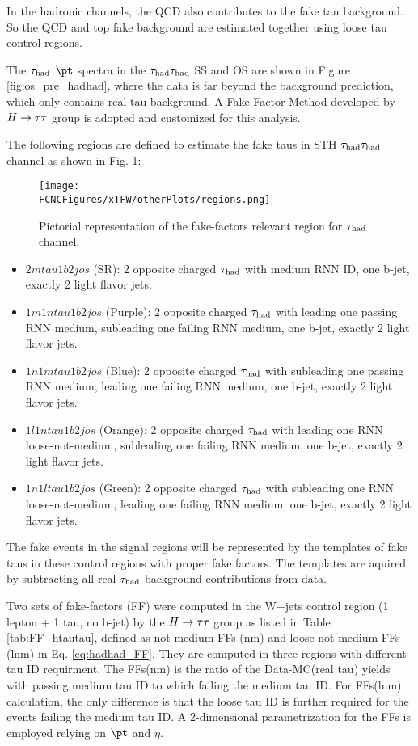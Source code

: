 In the hadronic channels, the QCD also contributes to the fake tau background. So the QCD and top fake background are estimated together using loose tau control regions.

The $\tau_\text{had}$ $\pt$ spectra in the $\tau_\text{had}{}\tau_\text{had}$ SS and OS are shown in Figure \ref{fig:os_pre_hadhad}, where the data is far beyond the background prediction, which only contains real tau background. A Fake Factor Method developed by $H \rightarrow \tau\tau$ group \cite{Htautau-note} is adopted and customized for this analysis. 

The following regions are defined to estimate the fake taus in STH $\tau_\text{had}{}\tau_\text{had}$ channel as shown in Fig. \ref{fig:regions_hadhad}:

\begin{figure}[htb]
\centering
\texttt{[image: \\FCNCFigures/xTFW/otherPlots/regions.png]}
\caption{Pictorial representation of the fake-factors relevant region for $\tau_\text{had}$ channel.}
\label{fig:regions_hadhad}
\end{figure}

\begin{itemize}
\item{$2mtau1b2jos$ (SR): 2 opposite charged $\tau_\text{had}$ with medium RNN ID, one b-jet, exactly 2 light flavor jets.}
\item{$1m1ntau1b2jos$ (Purple): 2 opposite charged $\tau_\text{had}$ with leading one passing RNN medium, subleading one failing RNN medium, one b-jet, exactly 2 light flavor jets.}
\item{$1n1mtau1b2jos$ (Blue): 2 opposite charged $\tau_\text{had}$ with subleading one passing RNN medium, leading one failing RNN medium, one b-jet, exactly 2 light flavor jets.}
\item{$1l1ntau1b2jos$ (Orange): 2 opposite charged $\tau_\text{had}$ with leading one RNN loose-not-medium, subleading one failing RNN medium, one b-jet, exactly 2 light flavor jets.}
\item{$1n1ltau1b2jos$ (Green): 2 opposite charged $\tau_\text{had}$ with subleading one RNN loose-not-medium, leading one failing RNN medium, one b-jet, exactly 2 light flavor jets.}
\end{itemize}

The fake events in the signal regions will be represented by the templates of fake taus in these control regions with proper fake factors. The templates are aquired by subtracting all real $\tau_\text{had}$ background contributions from data.

Two sets of fake-factors (FF) were computed in the W+jets control region (1 lepton + 1 tau, no b-jet) by the $H \rightarrow \tau\tau$ group \cite{Htautau-note} as listed in Table \ref{tab:FF_htautau}, defined as not-medium FFs (nm) and loose-not-medium FFs (lnm) in Eq. \ref{eq:hadhad_FF}. They are computed in three regions with different tau ID requirment. The FFs(nm) is the ratio of the Data-MC(real tau) yields with passing medium tau ID to which failing the medium tau ID. For FFs(lnm) calculation, the only difference is that the loose tau ID is further required for the events failing the medium tau ID. A 2-dimensional parametrization for the FFs is employed relying on $\pt$ and $\eta$.



